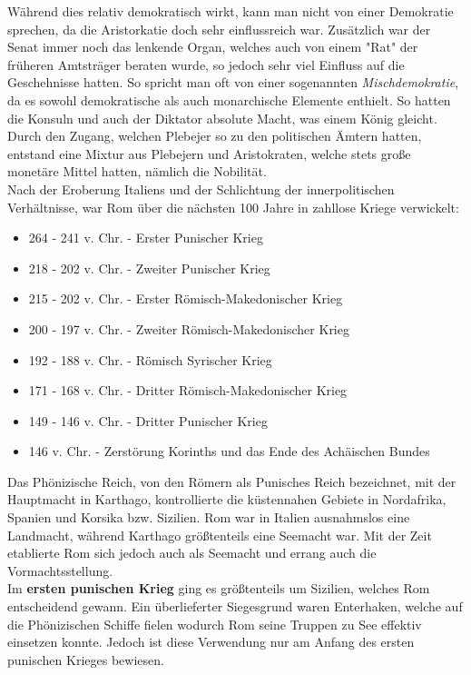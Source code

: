 \documentclass{article}
\begin{document}
	Während dies relativ demokratisch wirkt, kann man nicht von einer Demokratie sprechen, da die Aristorkatie doch sehr einflussreich war. Zusätzlich war der Senat immer noch das lenkende Organ, welches auch von einem "Rat" der früheren Amtsträger beraten wurde, so jedoch sehr viel Einfluss auf die Geschehnisse hatten. So spricht man oft von einer sogenannten \textit{Mischdemokratie}, da es sowohl demokratische als auch monarchische Elemente enthielt. So hatten die Konsuln und auch der Diktator absolute Macht, was einem König gleicht. \\
	Durch den Zugang, welchen Plebejer so zu den politischen Ämtern hatten, entstand eine Mixtur aus Plebejern und Aristokraten, welche stets große monetäre Mittel hatten, nämlich die Nobilität. \\
	Nach der Eroberung Italiens und der Schlichtung der innerpolitischen Verhältnisse, war Rom über die nächsten 100 Jahre in zahllose Kriege verwickelt:
	\begin{itemize}
		\item{264 - 241 v. Chr. - Erster Punischer Krieg}
		\item{218 - 202 v. Chr. - Zweiter Punischer Krieg}
		\item{215 - 202 v. Chr. - Erster Römisch-Makedonischer Krieg}
		\item{200 - 197 v. Chr. - Zweiter Römisch-Makedonischer Krieg}
		\item{192 - 188 v. Chr. - Römisch Syrischer Krieg}
		\item{171 - 168 v. Chr. - Dritter Römisch-Makedonischer Krieg}
		\item{149 - 146 v. Chr. - Dritter Punischer Krieg}
		\item{146 v. Chr. - Zerstörung Korinths und das Ende des Achäischen Bundes}
	\end{itemize}
	Das Phönizische Reich, von den Römern als Punisches Reich bezeichnet, mit der Hauptmacht in Karthago, kontrollierte die küstennahen Gebiete in Nordafrika, Spanien und Korsika bzw. Sizilien. Rom war in Italien ausnahmslos eine Landmacht, während Karthago größtenteils eine Seemacht war. Mit der Zeit etablierte Rom sich jedoch auch als Seemacht und errang auch die Vormachtsstellung. \\
	Im \textbf{ersten punischen Krieg} ging es größtenteils um Sizilien, welches Rom entscheidend gewann. Ein überlieferter Siegesgrund waren Enterhaken, welche auf die Phönizischen Schiffe fielen wodurch Rom seine Truppen zu See effektiv einsetzen konnte. Jedoch ist diese Verwendung nur am Anfang des ersten punischen Krieges bewiesen.\\
\end{document}
